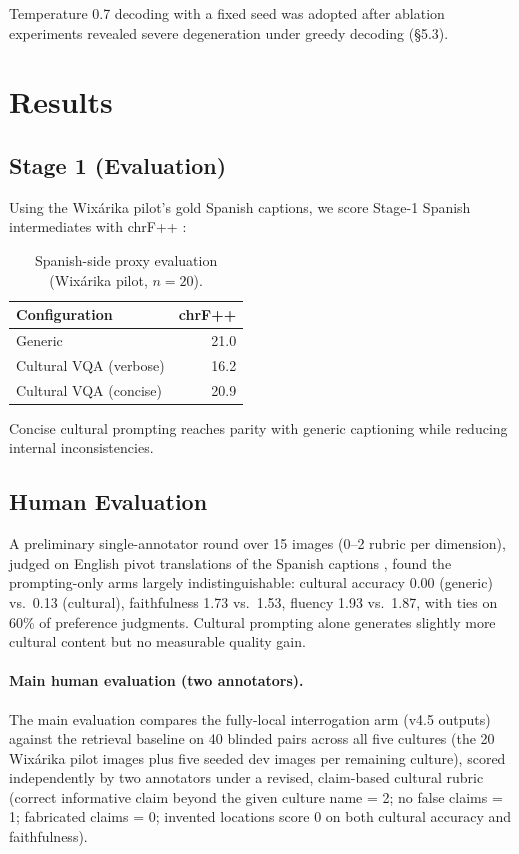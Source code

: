 \documentclass[11pt]{article}
\begin{document}
Temperature 0.7 decoding with a fixed seed was adopted after ablation
experiments revealed severe degeneration under greedy decoding (\S5.3).
\section{Results}

\subsection{Stage 1 (Evaluation)}
Using the Wixárika pilot's gold Spanish captions, we score Stage-1 Spanish
intermediates with chrF++ \citep{popovic2017chrfpp}:

\begin{table}[h]
\centering
\small
\begin{tabular}{lr}
\toprule
Configuration & chrF++ \\
\midrule
Generic                 & 21.0 \\
Cultural VQA (verbose)  & 16.2 \\
Cultural VQA (concise)  & 20.9 \\
\bottomrule
\end{tabular}
\caption{Spanish-side proxy evaluation (Wixárika pilot, $n{=}20$).}
\label{tab:proxy}
\end{table}

Concise cultural prompting reaches parity with generic captioning while
reducing internal inconsistencies.

\subsection{Human Evaluation}
A preliminary single-annotator round over 15 images (0--2 rubric per
dimension), judged on English pivot translations of the Spanish captions
\citep{hendy2023gpt,kocmi2023wmt}, found the prompting-only arms largely
indistinguishable: cultural accuracy 0.00 (generic) vs.\ 0.13 (cultural),
faithfulness 1.73 vs.\ 1.53, fluency 1.93 vs.\ 1.87, with ties on 60\% of
preference judgments. Cultural prompting alone generates slightly more
cultural content but no measurable quality gain.

\paragraph{Main human evaluation (two annotators).}
The main evaluation compares the fully-local interrogation arm (v4.5
outputs) against the retrieval baseline on 40 blinded pairs across all five
cultures (the 20 Wixárika pilot images plus five seeded dev images per
remaining culture), scored independently by two annotators under a revised,
claim-based cultural rubric (correct informative claim beyond the given culture name = 2; no
false claims = 1; fabricated claims = 0; invented locations score 0 on both
cultural accuracy and faithfulness).
\end{document}
